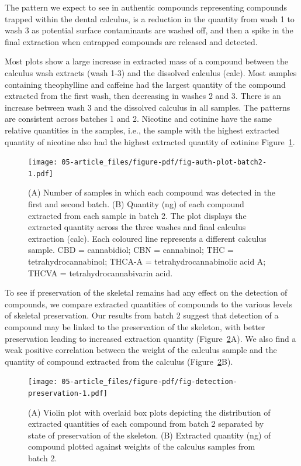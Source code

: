 \documentclass[
  letterpaper,
]{book}
\begin{document}
The pattern we expect to see in authentic compounds representing
compounds trapped within the dental calculus, is a reduction in the
quantity from wash 1 to wash 3 as potential surface contaminants are
washed off, and then a spike in the final extraction when entrapped
compounds are released and detected.

Most plots show a large increase in extracted mass of a compound between
the calculus wash extracts (wash 1-3) and the dissolved calculus (calc).
Most samples containing theophylline and caffeine had the largest
quantity of the compound extracted from the first wash, then decreasing
in washes 2 and 3. There is an increase between wash 3 and the dissolved
calculus in all samples. The patterns are consistent across batches 1
and 2. Nicotine and cotinine have the same relative quantities in the
samples, i.e., the sample with the highest extracted quantity of
nicotine also had the highest extracted quantity of cotinine
Figure~\ref{fig-auth-plot-batch2}.

\begin{figure}

{\centering \texttt{[image: 05-article\_files/figure-pdf/fig-auth-plot-batch2-1.pdf]}

}

\caption{\label{fig-auth-plot-batch2}(A) Number of samples in which each
compound was detected in the first and second batch. (B) Quantity (ng)
of each compound extracted from each sample in batch 2. The plot
displays the extracted quantity across the three washes and final
calculus extraction (calc). Each coloured line represents a different
calculus sample. CBD = cannabidiol; CBN = cannabinol; THC =
tetrahydrocannabinol; THCA-A = tetrahydrocannabinolic acid A; THCVA =
tetrahydrocannabivarin acid.}

\end{figure}

To see if preservation of the skeletal remains had any effect on the
detection of compounds, we compare extracted quantities of compounds to
the various levels of skeletal preservation. Our results from batch 2
suggest that detection of a compound may be linked to the preservation
of the skeleton, with better preservation leading to increased
extraction quantity (Figure~\ref{fig-detection-preservation}A). We also
find a weak positive correlation between the weight of the calculus
sample and the quantity of compound extracted from the calculus
(Figure~\ref{fig-detection-preservation}B).

\begin{figure}

{\centering \texttt{[image: 05-article\_files/figure-pdf/fig-detection-preservation-1.pdf]}

}

\caption{\label{fig-detection-preservation}(A) Violin plot with overlaid
box plots depicting the distribution of extracted quantities of each
compound from batch 2 separated by state of preservation of the
skeleton. (B) Extracted quantity (ng) of compound plotted against
weights of the calculus samples from batch 2.}

\end{figure}
\end{document}
